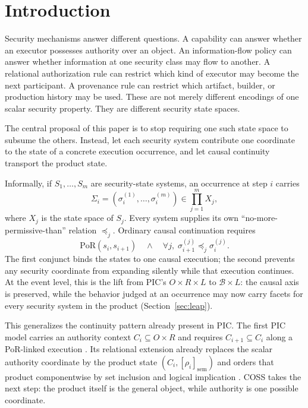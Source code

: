 \documentclass[10pt,twocolumn]{article}
\newcommand{\Model}{\textnormal{\textsc{COSS}}\xspace}
\newcommand{\PoR}{\mathrm{PoR}}
\newcommand{\state}{\Sigma}
\newcommand{\coord}{\sigma}
\begin{document}
\section{Introduction}

Security mechanisms answer different questions.  A capability can answer
whether an executor possesses authority over an object.  An information-flow
policy can answer whether information at one security class may flow to
another.  A relational authorization rule can restrict which kind of executor
may become the next participant.  A provenance rule can restrict which
artifact, builder, or production history may be used.  These are not merely
different encodings of one scalar security property.  They are different
security state spaces.

The central proposal of this paper is to stop requiring one such state space to
subsume the others.  Instead, let each security system contribute one
coordinate to the state of a concrete execution occurrence, and let causal
continuity transport the product state.

Informally, if $S_1,\ldots,S_m$ are security-state systems, an occurrence at
step $i$ carries
\begin{equation}
  \state_i = (\coord_i^{(1)},\ldots,\coord_i^{(m)})
  \in \prod_{j=1}^{m} X_j,
\end{equation}
where $X_j$ is the state space of $S_j$.  Every system supplies its own
``no-more-permissive-than'' relation $\preceq_j$.  Ordinary causal continuation
requires
\begin{equation}
  \PoR(s_i,s_{i+1})
  \quad\land\quad
  \forall j,\;
  \coord_{i+1}^{(j)} \preceq_j \coord_i^{(j)}.
  \label{eq:core-transition}
\end{equation}
The first conjunct binds the states to one causal execution; the second prevents
any security coordinate from expanding silently while that execution
continues. At the event level, this is the lift from PIC's
$O\times R\times L$ to $\mathcal{B}\times L$: the causal axis is preserved,
while the behavior judged at an occurrence may now carry facets for every
security system in the product (Section~\ref{sec:leap}).

This generalizes the continuity pattern already present in
PIC.  The first PIC model carries an authority context $C_i\subseteq O\times R$
and requires $C_{i+1}\subseteq C_i$ along a PoR-linked execution
\cite{gallo_poc2026}.  Its relational extension already replaces the scalar
authority coordinate by the product state $(C_i,[\rho_i]_{\mathrm{sem}})$ and
orders that product componentwise by set inclusion and logical implication
\cite{gallo_relational2026}.  \Model takes the next step: the product itself is
the general object, while authority is one possible coordinate.
\end{document}
